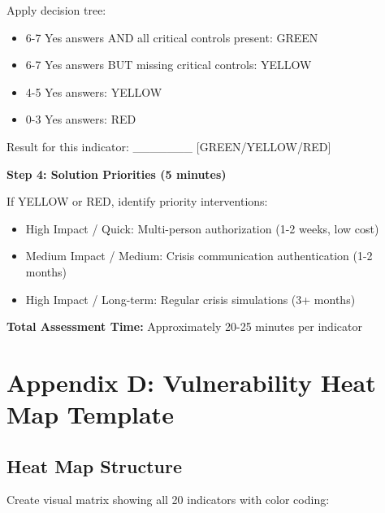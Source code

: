 \documentclass[11pt,a4paper]{article}
\begin{document}
Apply decision tree:
\begin{itemize}
\item 6-7 Yes answers AND all critical controls present: GREEN
\item 6-7 Yes answers BUT missing critical controls: YELLOW
\item 4-5 Yes answers: YELLOW
\item 0-3 Yes answers: RED
\end{itemize}

Result for this indicator: _______ [GREEN/YELLOW/RED]

\textbf{Step 4: Solution Priorities (5 minutes)}

If YELLOW or RED, identify priority interventions:
\begin{itemize}
\item High Impact / Quick: Multi-person authorization (1-2 weeks, low cost)
\item Medium Impact / Medium: Crisis communication authentication (1-2 months)
\item High Impact / Long-term: Regular crisis simulations (3+ months)
\end{itemize}

\textbf{Total Assessment Time:} Approximately 20-25 minutes per indicator

\section{Appendix D: Vulnerability Heat Map Template}

\subsection{Heat Map Structure}

Create visual matrix showing all 20 indicators with color coding:
\end{document}
